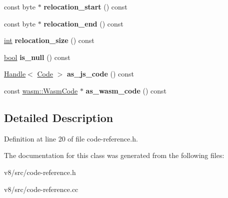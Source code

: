 \begin{DoxyCompactItemize}
\item 
\mbox{\label{classv8_1_1internal_1_1CodeReference_aee8a8535f7447d9e1bdd2ab4d114ae6c}} 
const byte $\ast$ {\bfseries relocation\+\_\+start} () const
\item 
\mbox{\label{classv8_1_1internal_1_1CodeReference_abf79800421cf4b557695eaf1761f33a0}} 
const byte $\ast$ {\bfseries relocation\+\_\+end} () const
\item 
\mbox{\label{classv8_1_1internal_1_1CodeReference_aa9008552de69527eca298f67adf25ddc}} 
\mbox{\hyperlink{classint}{int}} {\bfseries relocation\+\_\+size} () const
\item 
\mbox{\label{classv8_1_1internal_1_1CodeReference_a0679f4a10e88af0e365eeda954d01e6f}} 
\mbox{\hyperlink{classbool}{bool}} {\bfseries is\+\_\+null} () const
\item 
\mbox{\label{classv8_1_1internal_1_1CodeReference_a438f4ba56d836c9f8a84f125ea5678b8}} 
\mbox{\hyperlink{classv8_1_1internal_1_1Handle}{Handle}}$<$ \mbox{\hyperlink{classv8_1_1internal_1_1Code}{Code}} $>$ {\bfseries as\+\_\+js\+\_\+code} () const
\item 
\mbox{\label{classv8_1_1internal_1_1CodeReference_a3516c7d612147badd012571570454fe0}} 
const \mbox{\hyperlink{classv8_1_1internal_1_1wasm_1_1WasmCode}{wasm\+::\+Wasm\+Code}} $\ast$ {\bfseries as\+\_\+wasm\+\_\+code} () const
\end{DoxyCompactItemize}


\subsection{Detailed Description}


Definition at line 20 of file code-\/reference.\+h.



The documentation for this class was generated from the following files\+:\begin{DoxyCompactItemize}
\item 
v8/src/code-\/reference.\+h\item 
v8/src/code-\/reference.\+cc\end{DoxyCompactItemize}
